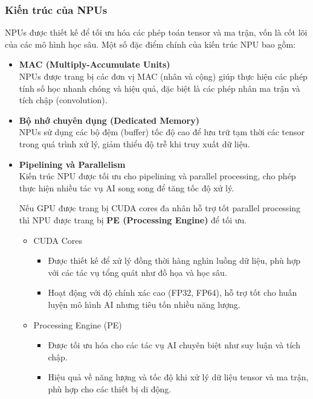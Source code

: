 \documentclass[a4paper]{article}
\begin{document}
\subsubsection{Kiến trúc của NPUs}
NPUs được thiết kế để tối ưu hóa các phép toán tensor và ma trận, vốn là cốt lõi của các mô hình học sâu. Một số đặc điểm chính của kiến trúc NPU bao gồm:

\begin{itemize}
    \item \textbf{MAC (Multiply-Accumulate Units)}\\
    NPUs được trang bị các đơn vị MAC (nhân và cộng) giúp thực hiện các phép tính số học nhanh chóng và hiệu quả, đặc biệt là các phép nhân ma trận và tích chập (convolution).



\item \textbf{Bộ nhớ chuyên dụng (Dedicated Memory)}\\
NPUs sử dụng các bộ đệm (buffer) tốc độ cao để lưu trữ tạm thời các tensor trong quá trình xử lý, giảm thiểu độ trễ khi truy xuất dữ liệu.

\item \textbf{Pipelining và Parallelism}\\
Kiến trúc NPU được tối ưu cho pipelining và parallel processing, cho phép thực hiện nhiều tác vụ AI song song để tăng tốc độ xử lý.

Nếu GPU được trang bị CUDA cores đa nhân hỗ trợ tốt parallel processing thì NPU được trang bị \textbf{PE (Processing Engine)} để tối ưu.
    \begin{itemize}
        \item CUDA Cores
        \begin{itemize}
        \item Được thiết kế để xử lý đồng thời hàng nghìn luồng dữ liệu, phù hợp với các tác vụ tổng quát như đồ họa và học sâu.
        \item Hoạt động với độ chính xác cao (FP32, FP64), hỗ trợ tốt cho huấn luyện mô hình AI nhưng tiêu tốn nhiều năng lượng.
        \end{itemize}
        
        \item{Processing Engine (PE)}
        \begin{itemize}
        \item Được tối ưu hóa cho các tác vụ AI chuyên biệt như suy luận và tích chập.
        \item Hiệu quả về năng lượng và tốc độ khi xử lý dữ liệu tensor và ma trận, phù hợp cho các thiết bị di động.
        \end{itemize}
    \end{itemize}
\end{itemize}
\end{document}
